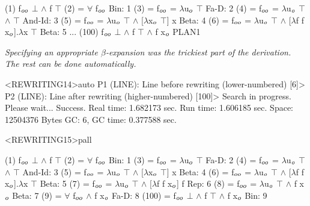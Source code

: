 \begin{tpsexample}
(1)      f\(\sb{oo}\) \(\bot\) \(\land\) f \(\top\)
(2)   =  \(\forall\) f\(\sb{oo}\)                                                           Bin: 1
(3)   =  f\(\sb{oo}\) = \(\lambda\)u\(\sb{o}\) \(\top\)                                                    Fa-D: 2
(4)   =  f\(\sb{oo}\) = \(\lambda\)u\(\sb{o}\) \(\top\) \(\land\) \(\top\)                                              And-Id: 3
(5)   =  f\(\sb{oo}\) = \(\lambda\)u\(\sb{o}\) \(\top\) \(\land\) [\(\lambda\)x\(\sb{o}\) \(\top\)] x                                        Beta: 4
(6)   =  f\(\sb{oo}\) = \(\lambda\)u\(\sb{o}\) \(\top\) \(\land\) [\(\lambda\)f f x\(\sb{o}\)].\(\lambda\)x \(\top\)                                   Beta: 5
               ...
(100)    f\(\sb{oo}\) \(\bot\) \(\land\) f \(\top\) \(\land\) f x\(\sb{o}\)                                               PLAN1

{\it Specifying an appropriate \(\beta\)-expansion was the trickiest part of the derivation. The rest can be done automatically.}

<REWRITING14>auto
P1 (LINE): Line before rewriting  (lower-numbered) [6]>
P2 (LINE): Line after rewriting  (higher-numbered) [100]>
Search in progress. Please wait...
Success.
Real time: 1.682173 sec.
Run time: 1.606185 sec.
Space: 12504376 Bytes
GC: 6, GC time: 0.377588 sec.

<REWRITING15>pall

(1)      f\(\sb{oo}\) \(\bot\) \(\land\) f \(\top\)
(2)   =  \(\forall\) f\(\sb{oo}\)                                                           Bin: 1
(3)   =  f\(\sb{oo}\) = \(\lambda\)u\(\sb{o}\) \(\top\)                                                    Fa-D: 2
(4)   =  f\(\sb{oo}\) = \(\lambda\)u\(\sb{o}\) \(\top\) \(\land\) \(\top\)                                              And-Id: 3
(5)   =  f\(\sb{oo}\) = \(\lambda\)u\(\sb{o}\) \(\top\) \(\land\) [\(\lambda\)x\(\sb{o}\) \(\top\)] x                                        Beta: 4
(6)   =  f\(\sb{oo}\) = \(\lambda\)u\(\sb{o}\) \(\top\) \(\land\) [\(\lambda\)f f x\(\sb{o}\)].\(\lambda\)x \(\top\)                                   Beta: 5
(7)   =  f\(\sb{oo}\) = \(\lambda\)u\(\sb{o}\) \(\top\) \(\land\) [\(\lambda\)f f x\(\sb{o}\)] f                                       Rep: 6
(8)   =  f\(\sb{oo}\) = \(\lambda\)u\(\sb{o}\) \(\top\) \(\land\) f x\(\sb{o}\)                                             Beta: 7
(9)   =  \(\forall\) f\(\sb{oo}\) \(\land\) f x\(\sb{o}\)                                                   Fa-D: 8
(100) =  f\(\sb{oo}\) \(\bot\) \(\land\) f \(\top\) \(\land\) f x\(\sb{o}\)                                              Bin: 9


\end{tpsexample}
